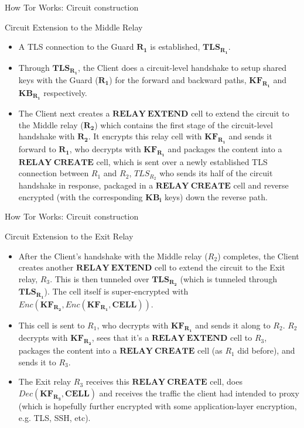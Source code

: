 \documentclass[9pt,a4paper]{beamer}
\begin{document}
\begin{frame}{How Tor Works: Circuit construction}
  \begin{block}{Circuit Extension to the Middle Relay}
    \begin{itemize}
      \item<1-> A TLS connection to the Guard $\mathbf{R_1}$ is established, $\mathbf{TLS_{R_1}}$.
      \item<2-> Through $\mathbf{TLS_{R_1}}$, the Client does a circuit-level handshake to setup
        shared keys with the Guard ($\mathbf{R_1}$) for the forward and backward paths,
        $\mathbf{KF_{R_1}}$ and $\mathbf{KB_{R_1}}$ respectively.
      \item<3-> The Client next creates a $\mathbf{RELAY\:EXTEND}$ cell to extend the circuit to the
        Middle relay ($\mathbf{R_2}$) which contains the first stage of the circuit-level handshake
        with $\mathbf{R_2}$. It encrypts this relay cell with $\mathbf{KF_{R_1}}$ and sends it
        forward to $\mathbf{R_1}$, who decrypts with $\mathbf{KF_{R_1}}$ and packages the content
        into a ${\mathbf{RELAY\:CREATE}}$ cell, which is sent over a newly established TLS
        connection between ${R_1}$ and ${R_2}$, $TLS_{R_2}$ who sends its half of the circuit
        handshake in response, packaged in a ${\mathbf{RELAY\:CREATE}}$ cell and reverse encrypted
        (with the corresponding $\mathbf{KB_i}$ keys) down the reverse path.
  \end{itemize}
  \end{block}
\end{frame}


\begin{frame}{How Tor Works: Circuit construction}
  \begin{block}{Circuit Extension to the Exit Relay}
    \begin{itemize}
      \item<1-> After the Client's handshake with the Middle relay ($R_2$) completes, the Client
        creates another $\mathbf{RELAY\:EXTEND}$ cell to extend the circuit to the Exit relay,
        $R_3$.  This is then tunneled over $\mathbf{TLS_{R_2}}$ (which is tunneled through
        $\mathbf{TLS_{R_1}}$). The cell itself is super-encrypted with \\
        $Enc\left(\mathbf{KF_{R_2}}, Enc\left(\mathbf{KF_{R_1}}, \mathbf{CELL}\right)\right)$.
      \item<2-> This cell is sent to $R_1$, who decrypts with $\mathbf{KF_{R_1}}$ and sends it along
        to $R_2$.  $R_2$ decrypts with $\mathbf{KF_{R_2}}$, sees that it's a
        $\mathbf{RELAY\:EXTEND}$ cell to $R_3$, packages the content into a
        ${\mathbf{RELAY\:CREATE}}$ cell (as $R_1$ did before), and sends it to $R_3$.
      \item<3-> The Exit relay $R_3$ receives this ${\mathbf{RELAY\:CREATE}}$ cell, does
        $Dec\left(\mathbf{KF_{R_3}, CELL}\right)$ and receives the traffic the client had intended
        to proxy (which is hopefully further encrypted with some application-layer encryption,
        e.g. TLS, SSH, etc).  
    \end{itemize}
  \end{block}
\end{frame}
\end{document}
